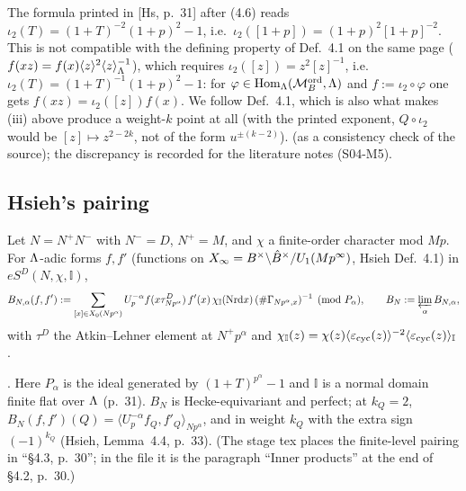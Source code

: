 \begin{remark}\label{rem:s04-iota2}
The formula printed in [Hs, p.~31] after (4.6) reads $\iota_2(T)=(1+T)^{-2}(1+p)^2-1$, i.e.\ $\iota_2([1+p])=(1+p)^2[1+p]^{-2}$. This is
not compatible with the defining property of Def.~4.1 on the same page ($f(xz)=f(x)\langle z\rangle^2\langle z\rangle_\Lambda^{-1}$), which
requires $\iota_2([z])=z^2[z]^{-1}$, i.e.\ $\iota_2(T)=(1+T)^{-1}(1+p)^2-1$: for $\varphi\in\operatorname{Hom}_\Lambda(\mathcal{M}^{\mathrm{ord}}_B,\Lambda)$ and
$f:=\iota_2\circ\varphi$ one gets $f(xz)=\iota_2([z])f(x)$. We follow Def.~4.1, which is also what makes (iii) above produce a weight-$k$
point at all (with the printed exponent, $Q\circ\iota_2$ would be $[z]\mapsto z^{2-2k}$, not of the form $u^{\pm(k-2)}$). \stproved{}
(as a consistency check of the source); the discrepancy is recorded for the literature notes (S04-M5).
\end{remark}

\subsection{Hsieh's pairing}

\begin{definition}\label{def:s04-BN}
Let $N=N^+N^-$ with $N^-=D$, $N^+=M$, and $\chi$ a finite-order character mod $Mp$. For $\Lambda$-adic forms $f,f'$ (functions on
$X_\infty=B^\times\backslash\hat{B}^\times/U_1(Mp^\infty)$, Hsieh Def.~4.1) in $eS^D(N,\chi,\mathbb I)$,
\[B_{N,\alpha}(f,f'):=\sum_{[x]\in X_0(Np^\alpha)}U_p^{-\alpha}f(x\tau^D_{Np^\alpha})\,f'(x)\,\chi_{\mathbb I}(\mathrm{Nrd} x)\,(\#\Gamma_{Np^\alpha,x})^{-1}\pmod{P_\alpha},\qquad
B_N:=\varprojlim_\alpha B_{N,\alpha},\]
with $\tau^D$ the Atkin--Lehner element at $N^+p^\alpha$ and $\chi_{\mathbb I}(z)=\chi(z)\langle\varepsilon_{\rm cyc}(z)\rangle^{-2}\langle\varepsilon_{\rm cyc}(z)\rangle_{\mathbb I}$.
\end{definition}
\noindent\stcited{} . Here $P_\alpha$ is the ideal
generated by $(1+T)^{p^\alpha}-1$ and $\mathbb I$ is a normal domain finite flat over $\Lambda$ (p.~31). $B_N$ is Hecke-equivariant
and perfect; at $k_Q=2$, $B_N(f,f')(Q)=\langle U_p^{-\alpha}f_Q,f'_Q\rangle_{Np^\alpha}$, and in weight $k_Q$ with the extra sign
$(-1)^{k_Q}$ (Hsieh, Lemma~4.4, p.~33). (The stage tex places the finite-level pairing in ``\S4.3, p.~30''; in the file it is the
paragraph ``Inner products'' at the end of \S4.2, p.~30.)

